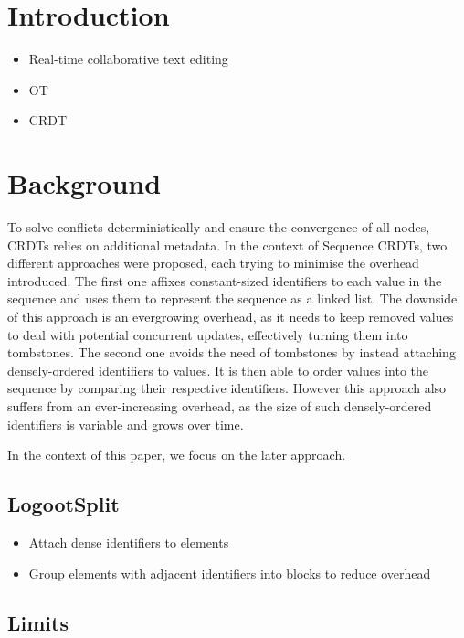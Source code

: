 \documentclass[sigplan,10pt]{acmart}
\begin{document}
\section{Introduction}

\begin{itemize}
    \item Real-time collaborative text editing
    \item \ac{OT}
    \item \ac{CRDT} \cite{shapiro_2011_crdt}
\end{itemize}

\section{Background}

To solve conflicts deterministically and ensure the convergence of all nodes, \acp{CRDT} relies on additional metadata.
In the context of Sequence \acp{CRDT}, two different approaches were proposed, each trying to minimise the overhead introduced.
The first one \cite{oster:inria-00108523, ROH2011354,briot:hal-01343941} affixes constant-sized identifiers to each value in the sequence and uses them to represent the sequence as a linked list.
The downside of this approach is an evergrowing overhead, as it needs to keep removed values to deal with potential concurrent updates, effectively turning them into tombstones.
The second one \cite{5158449,WeissICDCS09,AndreCollaborateCom2013} avoids the need of tombstones by instead attaching densely-ordered identifiers to values.
It is then able to order values into the sequence by comparing their respective identifiers.
However this approach also suffers from an ever-increasing overhead, as the size of such densely-ordered identifiers is variable and grows over time.

In the context of this paper, we focus on the later approach.

\subsection{LogootSplit}

\begin{itemize}
    \item Attach dense identifiers to elements
    \item Group elements with adjacent identifiers into blocks to reduce overhead
\end{itemize}

\subsection{Limits}
\end{document}
